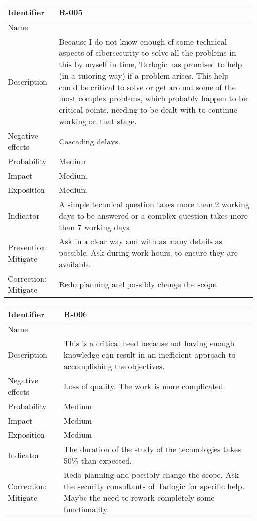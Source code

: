 \begin{table}[H]
	\begin{tabularx}{\textwidth}{|y|z|}
		\hline
		Identifier & \textbf{R-005} \\ \hline
		Name & \Rcinco \\ \hline
		Description &
			Because I do not know enough of some technical aspects of cibersecurity to solve all the problems in this by myself in time, Tarlogic has promised to help (in a tutoring way) if a problem arises. \linej
			This help could be critical to solve or get around some of the most complex problems, which probably happen to be critical points, needing to be dealt with to continue working on that stage.
		\\ \hline
		Negative effects &
			Cascading delays.
		\\ \hline
		Probability & Medium\\ \hline
		Impact &  Medium\\ \hline
		Exposition &  Medium\\ \hline
		Indicator & A simple technical question takes more than 2 working days to be answered or a complex question takes more than 7 working days.\\ \hline
		Prevention: Mitigate &
			Ask in a clear way and with as many details as possible. \linej
			Ask during work hours, to ensure they are available.
		\\ \hline
		Correction: Mitigate &
			Redo planning and possibly change the scope.
		\\ \hline
	\end{tabularx}
\end{table}

\begin{table}[H]
	\begin{tabularx}{\textwidth}{|y|z|}
		\hline
		Identifier & \textbf{R-006} \\ \hline
		Name & \Rseis \\ \hline
		Description &
			This is a critical need because not having enough knowledge can result in an inefficient approach to accomplishing the objectives.
		\\ \hline
		Negative effects &
			Loss of quality. \linej
			The work is more complicated.
		\\ \hline
		Probability & Medium\\ \hline
		Impact &  Medium\\ \hline
		Exposition &  Medium\\ \hline
		Indicator & The duration of the study of the technologies takes 50\% than expected. \\ \hline
		Correction: Mitigate &
			Redo planning and possibly change the scope.  \linej
			Ask the security consultants of Tarlogic for specific help. \linej
			Maybe the need to rework completely some functionality.
		\\ \hline
	\end{tabularx}
\end{table}

